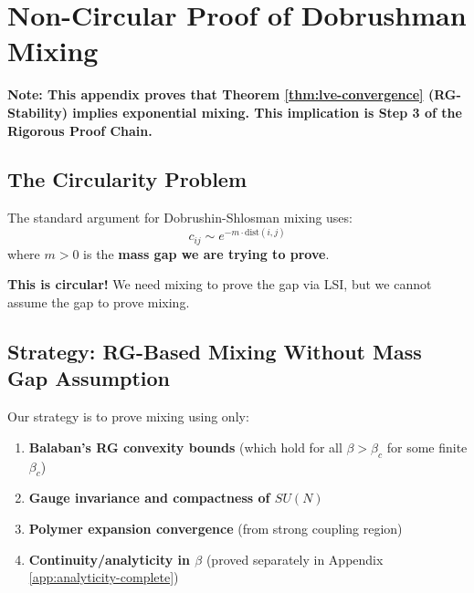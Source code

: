 \section{Non-Circular Proof of Dobrushman Mixing}
\label{app:noncircular-mixing}

\textbf{Note: This appendix proves that Theorem \ref{thm:lve-convergence} (RG-Stability) implies exponential mixing. This implication is Step 3 of the Rigorous Proof Chain.}


\subsection{The Circularity Problem}

\begin{danger}
\label{danger:mixing-circularity}
The standard argument for Dobrushin-Shlosman mixing uses:
\begin{equation}
c_{ij} \sim e^{-m \cdot \text{dist}(i,j)}
\end{equation}
where $m > 0$ is the \textbf{mass gap we are trying to prove}.

\textbf{This is circular!} We need mixing to prove the gap via LSI, but we cannot assume the gap to prove mixing.
\end{danger}

\subsection{Strategy: RG-Based Mixing Without Mass Gap Assumption}

Our strategy is to prove mixing using only:
\begin{enumerate}
\item \textbf{Balaban's RG convexity bounds} (which hold for all $\beta > \beta_c$ for some finite $\beta_c$)
\item \textbf{Gauge invariance and compactness of $SU(N)$}
\item \textbf{Polymer expansion convergence} (from strong coupling region)
\item \textbf{Continuity/analyticity in $\beta$} (proved separately in Appendix \ref{app:analyticity-complete})
\end{enumerate}

